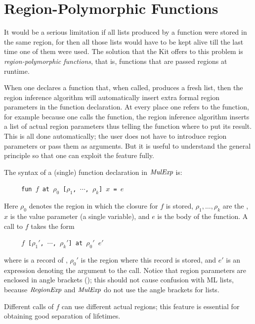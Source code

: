 \documentclass[12pt]{book}
\begin{document}
\section{Region-Polymorphic Functions}
It would be a serious limitation if 
all lists produced by a function were stored
in the same region, for then all those lists would have to be kept
alive till the last time one of them were used. The solution that the Kit
offers to this problem is {\em region-polymorphic functions}, that is, functions
that are passed regions at runtime. 

When one declares a function that, when called, produces
a fresh list, then the region inference algorithm will automatically insert extra
formal region parameters in the function declaration.
At every place one refers to the function, for example because one calls the function,
the region inference algorithm inserts
a list of actual region parameters thus telling the function where to put its
result. This is all done automatically; the user does not have to introduce
region parameters or pass them as arguments. But it is useful to understand
the general principle so that one can exploit the feature fully.

The syntax of a (single) function declaration in $\hbox{\it MulExp}$ is:
\begin{tabbing}
\ \ \ \ \ \=\tt fun $f$ at $\rho_0$ [$\rho_1$, $\cdots$, $\rho_k$] $x$ = $e$
\end{tabbing}
Here $\rho_0$ denotes the region in which the closure for $f$ is stored,
$\rho_1, \ldots,\rho_k$ are 
the , $x$ is the
value parameter (a single variable), and $e$ is the body of the function.
A call to $f$ takes the form
\begin{tabbing}
\ \ \ \ \ \=\tt $f$  [$\rho_1'$, $\cdots$, $\rho_k'$] at $\rho_0'$ $e'$
\end{tabbing}
where  is a record of ,
$\rho_0'$ is the region where this record is stored, and $e'$ is an expression
denoting the argument to the call. Notice that region parameters are enclosed in angle brackets
(\boxml{[ ]}); this should not cause confusion with ML lists, because $\hbox{\it RegionExp}$ and $\hbox{\it MulExp}$
do not use the angle brackets for lists.

Different calls of $f$ can use different actual regions; this feature
is essential for obtaining good separation of lifetimes.
\end{document}
